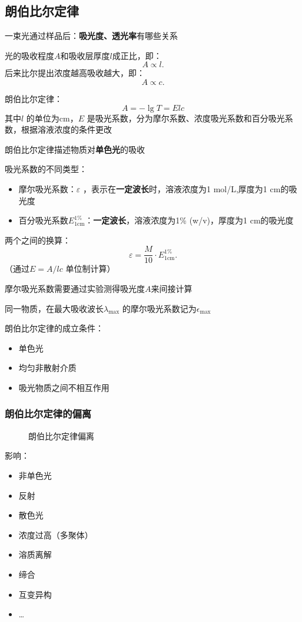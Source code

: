 \subsection{朗伯比尔定律}%
\label{sub:朗伯比尔定律}
一束光通过样品后：\textbf{吸光度、透光率}有哪些关系
\begin{notation}
    光的吸收程度$A$和吸收层厚度$l$成正比，即： \[
        A\propto l
    .\]
    后来比尔提出浓度越高吸收越大，即：\[
        A \propto c
    .\]
\end{notation}
朗伯比尔定律：\begin{equation}
    \label{eq:朗伯比尔定律}
    A = -\lg T = Elc
\end{equation}
其中$l$ 的单位为cm，$E$ 是吸光系数，分为摩尔系数、浓度吸光系数和百分吸光系数，根据溶液浓度的条件更改
\begin{notation}
    朗伯比尔定律描述物质对\textbf{单色光}的吸收
\end{notation}
吸光系数的不同类型：
\begin{itemize}
    \item 摩尔吸光系数：$\varepsilon$ ，表示在\textbf{一定波长}时，溶液浓度为1 mol/L,厚度为1 cm的吸光度
    \item 百分吸光系数$E_{1\text{cm}}^{1\%}$：\textbf{一定波长}，溶液浓度为1\% (w/v)，厚度为1 cm的吸光度
\end{itemize}
两个之间的换算：\[
    \varepsilon = \frac{M}{10}\cdot E_{1\text{cm}}^{1\%}
.\]
（通过$E = A / lc$ 单位制计算）
\begin{notation}
    摩尔吸光系数需要通过实验测得吸光度$A$来间接计算
\end{notation}
同一物质，在最大吸收波长$\lambda_\text{max}$ 的摩尔吸光系数记为$\epsilon_\text{max}$
\begin{notation}
    朗伯比尔定律的成立条件：
    \begin{itemize}
        \item 单色光
        \item 均匀非散射介质
        \item 吸光物质之间不相互作用
        
    \end{itemize}
\end{notation}
\subsubsection*{朗伯比尔定律的偏离}%
\label{subsub*:朗伯比尔定律的偏离}
\begin{figure}[ht!]
    \centering
    \caption{朗伯比尔定律偏离}
    \label{fig:朗伯比尔定律偏离}
\end{figure}
影响：
\begin{itemize}
    \item 非单色光
    \item 反射
    \item 散色光
    \item 浓度过高（多聚体）
    \item 溶质离解
    \item 缔合
    \item 互变异构
    \item \ldots 
\end{itemize}

